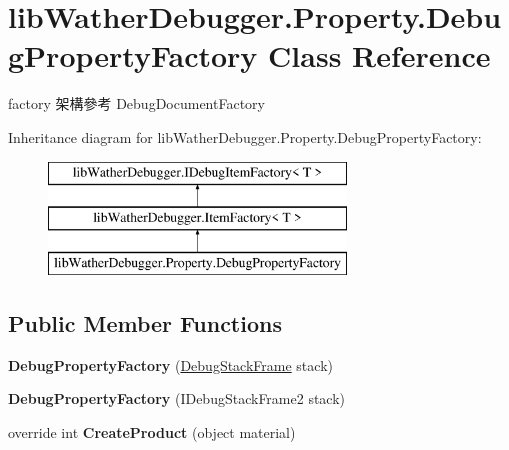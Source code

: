 \hypertarget{classlib_wather_debugger_1_1_property_1_1_debug_property_factory}{\section{lib\+Wather\+Debugger.\+Property.\+Debug\+Property\+Factory Class Reference}
\label{classlib_wather_debugger_1_1_property_1_1_debug_property_factory}
}


factory 架構參考 Debug\+Document\+Factory  


Inheritance diagram for lib\+Wather\+Debugger.\+Property.\+Debug\+Property\+Factory\+:\begin{figure}[H]
\begin{center}
\leavevmode
\includegraphics[height=3.000000cm]{classlib_wather_debugger_1_1_property_1_1_debug_property_factory}
\end{center}
\end{figure}
\subsection*{Public Member Functions}
\begin{DoxyCompactItemize}
\item 
\hypertarget{classlib_wather_debugger_1_1_property_1_1_debug_property_factory_a1add13e740c3cb664cc959a915db9b27}{{\bfseries Debug\+Property\+Factory} (\hyperlink{classlib_wather_debugger_1_1_stack_1_1_debug_stack_frame}{Debug\+Stack\+Frame} stack)}\label{classlib_wather_debugger_1_1_property_1_1_debug_property_factory_a1add13e740c3cb664cc959a915db9b27}

\item 
\hypertarget{classlib_wather_debugger_1_1_property_1_1_debug_property_factory_a3b24c009905da5cb67050fe1923d682d}{{\bfseries Debug\+Property\+Factory} (I\+Debug\+Stack\+Frame2 stack)}\label{classlib_wather_debugger_1_1_property_1_1_debug_property_factory_a3b24c009905da5cb67050fe1923d682d}

\item 
\hypertarget{classlib_wather_debugger_1_1_property_1_1_debug_property_factory_a3ff2010ac67a61fc51c7a88869d77d68}{override int {\bfseries Create\+Product} (object material)}\label{classlib_wather_debugger_1_1_property_1_1_debug_property_factory_a3ff2010ac67a61fc51c7a88869d77d68}

\end{DoxyCompactItemize}
